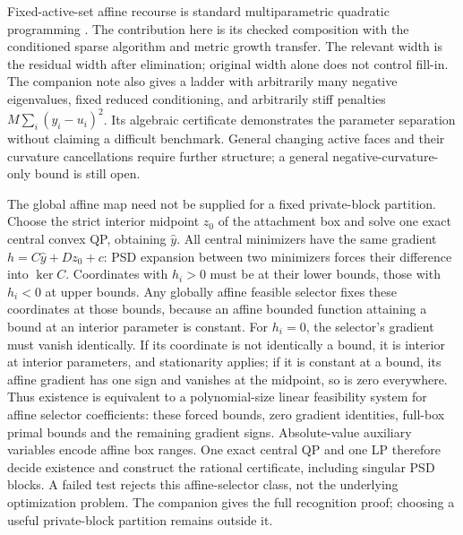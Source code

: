 Fixed-active-set affine recourse is standard multiparametric quadratic
programming \cite{BemporadEtAl2002}. The contribution here is its checked
composition with the conditioned sparse algorithm and metric growth
transfer. The relevant width is the residual width after elimination;
original width alone does not control fill-in. The companion note also
gives a ladder with arbitrarily many negative eigenvalues, fixed reduced
conditioning, and arbitrarily stiff penalties $M\sum_i(y_i-u_i)^2$.
Its algebraic certificate demonstrates the parameter separation without
claiming a difficult benchmark. General changing active faces and
their curvature cancellations require further structure; a general
negative-curvature-only bound is still open.

The global affine map need not be supplied for a fixed private-block
partition. Choose the strict interior midpoint $z_0$ of the attachment
box and solve one exact central convex QP, obtaining $\widehat y$.
All central minimizers have the same gradient
$h=C\widehat y+Dz_0+c$: PSD expansion between two minimizers forces
their difference into $\ker C$. Coordinates with $h_i>0$ must be at
their lower bounds, those with $h_i<0$ at upper bounds. Any globally
affine feasible selector fixes these coordinates at those bounds,
because an affine bounded function attaining a bound at an interior
parameter is constant. For $h_i=0$, the selector's gradient must vanish
identically. If its coordinate is not identically a bound, it is interior
at interior parameters, and stationarity applies; if it is constant at a bound, its
affine gradient has one sign and vanishes at the midpoint, so is zero
everywhere. Thus existence is equivalent to a polynomial-size linear
feasibility system for affine selector coefficients: these forced bounds,
zero gradient identities, full-box primal bounds and the remaining
gradient signs. Absolute-value auxiliary variables encode affine box
ranges. One exact central QP and one LP therefore decide existence and
construct the rational certificate, including singular PSD blocks. A
failed test rejects this affine-selector class, not the underlying
optimization problem. The companion gives the full recognition proof;
choosing a useful private-block partition remains outside it.

